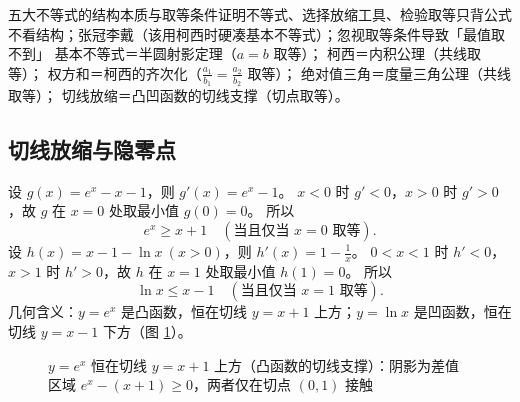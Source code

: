 \begin{explore}
\begin{conccard}[二级]{五大不等式的结构本质与取等条件}{证明不等式、选择放缩工具、检验取等}{只背公式不看结构；张冠李戴（该用柯西时硬凑基本不等式）；忽视取等条件导致「最值取不到」}
基本不等式＝半圆射影定理（$a=b$ 取等）；
柯西＝内积公理（共线取等）；
权方和＝柯西的齐次化（$\frac{a_1}{b_1}=\frac{a_2}{b_2}$ 取等）；
绝对值三角＝度量三角公理（共线取等）；
切线放缩＝凸凹函数的切线支撑（切点取等）。
\end{conccard}

\subsection{切线放缩与隐零点}


\begin{derivation}
设 $g(x)=e^x-x-1$，则 $g'(x)=e^x-1$。
$x<0$ 时 $g'<0$，$x>0$ 时 $g'>0$，故 $g$ 在 $x=0$ 处取最小值 $g(0)=0$。
所以
\[
  e^x\ge x+1\quad(\text{当且仅当 }x=0\text{ 取等}).
\]
设 $h(x)=x-1-\ln x\ (x>0)$，则 $h'(x)=1-\frac1x$。
$0<x<1$ 时 $h'<0$，$x>1$ 时 $h'>0$，故 $h$ 在 $x=1$ 处取最小值 $h(1)=0$。
所以
\[
  \ln x\le x-1\quad(\text{当且仅当 }x=1\text{ 取等}).
\]
几何含义：$y=e^x$ 是凸函数，恒在切线 $y=x+1$ 上方；$y=\ln x$ 是凹函数，恒在切线 $y=x-1$ 下方（图 \ref{fig:tangent-exp}）。
\end{derivation}

\begin{figure}[htbp]
  \centering
  \caption{$y=e^x$ 恒在切线 $y=x+1$ 上方（凸函数的切线支撑）：阴影为差值区域 $e^x-(x+1)\ge0$，两者仅在切点 $(0,1)$ 接触}
  \label{fig:tangent-exp}
\end{figure}


\end{explore}
